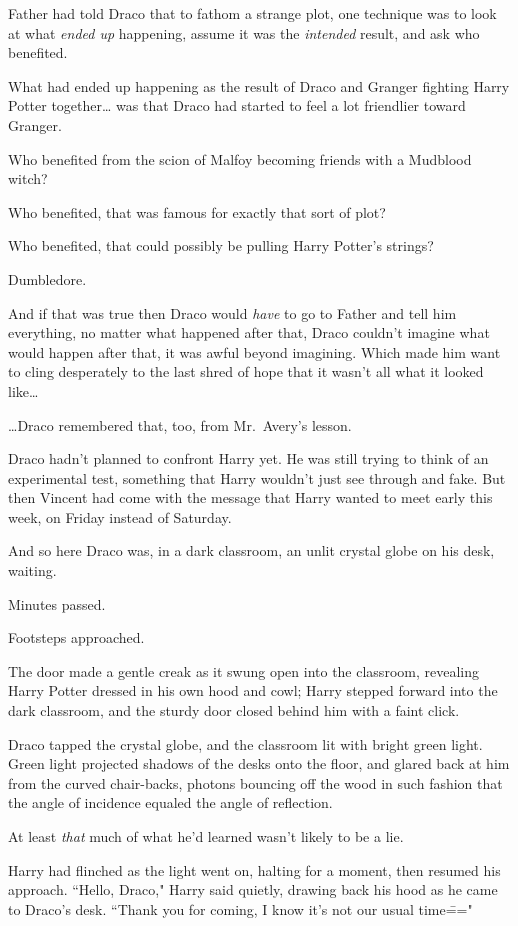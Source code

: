 Father had told Draco that to fathom a strange plot, one technique was to look at what \emph{ended up} happening, assume it was the \emph{intended} result, and ask who benefited.

What had ended up happening as the result of Draco and Granger fighting Harry Potter together{\ldots} was that Draco had started to feel a lot friendlier toward Granger.

Who benefited from the scion of Malfoy becoming friends with a Mudblood witch?

Who benefited, that was famous for exactly that sort of plot?

Who benefited, that could possibly be pulling Harry Potter's strings?

Dumbledore.

And if that was true then Draco would \emph{have} to go to Father and tell him everything, no matter what happened after that, Draco couldn't imagine what would happen after that, it was awful beyond imagining. Which made him want to cling desperately to the last shred of hope that it wasn't all what it looked like{\ldots}

{\ldots}Draco remembered that, too, from Mr.~Avery's lesson.

Draco hadn't planned to confront Harry yet. He was still trying to think of an experimental test, something that Harry wouldn't just see through and fake. But then Vincent had come with the message that Harry wanted to meet early this week, on Friday instead of Saturday.

And so here Draco was, in a dark classroom, an unlit crystal globe on his desk, waiting.

Minutes passed.

Footsteps approached.

The door made a gentle creak as it swung open into the classroom, revealing Harry Potter dressed in his own hood and cowl; Harry stepped forward into the dark classroom, and the sturdy door closed behind him with a faint click.

Draco tapped the crystal globe, and the classroom lit with bright green light. Green light projected shadows of the desks onto the floor, and glared back at him from the curved chair-backs, photons bouncing off the wood in such fashion that the angle of incidence equaled the angle of reflection.

At least \emph{that} much of what he'd learned wasn't likely to be a lie.

Harry had flinched as the light went on, halting for a moment, then resumed his approach. ``Hello, Draco," Harry said quietly, drawing back his hood as he came to Draco's desk. ``Thank you for coming, I know it's not our usual time\==="

